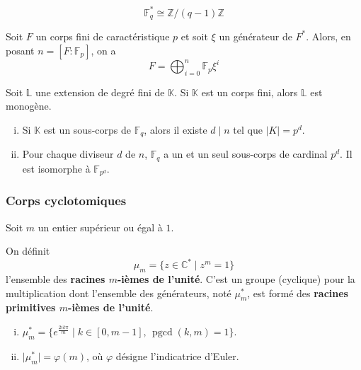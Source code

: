 	\begin{corollary}
		\[ \mathbb{F}_q^* \cong \mathbb{Z}/(q-1)\mathbb{Z} \]
	\end{corollary}

	\begin{proposition}
		Soit $F$ un corps fini de caractéristique $p$ et soit $\xi$ un générateur de $F^*$. Alors, en posant $n = [F:\mathbb{F}_p]$, on a
		\[ F = \bigoplus_{i=0}^n \mathbb{F}_p \xi^i \]
	\end{proposition}

	\begin{theorem}
		Soit $\mathbb{L}$ une extension de degré fini de $\mathbb{K}$. Si $\mathbb{K}$ est un corps fini, alors $\mathbb{L}$ est monogène.
	\end{theorem}


	\begin{theorem}
		\begin{enumerate}[(i)]
			\item Si $\mathbb{K}$ est un sous-corps de $\mathbb{F}_q$, alors il existe $d \mid n$ tel que $\vert K \vert = p^d$.
			\item Pour chaque diviseur $d$ de $n$, $\mathbb{F}_q$ a un et un seul sous-corps de cardinal $p^d$. Il est isomorphe à $\mathbb{F}_{p^d}$.
		\end{enumerate}
	\end{theorem}

	\subsubsection{Corps cyclotomiques}

	Soit $m$ un entier supérieur ou égal à $1$.


	\begin{definition}
		On définit
		\[ \mu_m = \{ z \in \mathbb{C}^* \mid z^m = 1 \} \]
		l'ensemble des \textbf{racines $m$-ièmes de l'unité}. C'est un groupe (cyclique) pour la multiplication dont l'ensemble des générateurs, noté $\mu_m^*$, est formé des \textbf{racines primitives $m$-ièmes de l'unité}.
	\end{definition}

	\begin{proposition}
		\begin{enumerate}[(i)]
			\item $\mu_m^* = \{ e^{\frac{2ik\pi}{m}} \mid k \in [0, m-1], \, \operatorname{pgcd}(k, m) = 1 \}$.
			\item $\vert \mu_m^* \vert = \varphi(m)$, où $\varphi$ désigne l'indicatrice d'Euler.
		\end{enumerate}
	\end{proposition}

